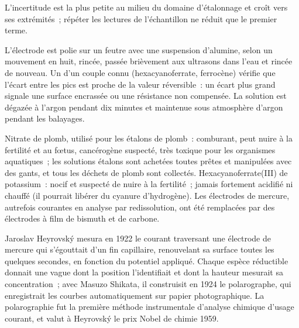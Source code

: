 L'incertitude est la plus petite au milieu du domaine d'étalonnage et
croît vers ses extrémités~; répéter les lectures de l'échantillon ne
réduit que le premier terme.

\begin{inthelab}
L'électrode est polie sur un feutre avec une suspension d'alumine, selon
un mouvement en huit, rincée, passée brièvement aux ultrasons dans l'eau
et rincée de nouveau. Un  d'un couple connu
(hexacyanoferrate, ferrocène) vérifie que l'écart entre les pics est
proche de la valeur réversible~: un écart plus grand signale une surface
encrassée ou une résistance non compensée. La solution est dégazée à
l'argon pendant dix minutes et maintenue sous atmosphère d'argon pendant
les balayages.
\end{inthelab}

\begin{safety}{}
Nitrate de plomb, utilisé pour les étalons de plomb~: comburant, peut
nuire à la fertilité et au fœtus, cancérogène suspecté, très toxique
pour les organismes aquatiques~; les solutions étalons sont achetées
toutes prêtes et manipulées avec des gants, et tous les déchets de plomb
sont collectés. Hexacyanoferrate(III) de potassium~: nocif et suspecté
de nuire à la fertilité~; jamais fortement acidifié ni chauffé (il
pourrait libérer du cyanure d'hydrogène). Les électrodes de mercure,
autrefois courantes en analyse par redissolution, ont été remplacées par
des électrodes à film de bismuth et de carbone.
\end{safety}

\begin{history}
Jaroslav Heyrovský mesura en 1922 le courant traversant une électrode de
mercure qui s'égouttait d'un fin capillaire, renouvelant sa surface
toutes les quelques secondes, en fonction du potentiel appliqué. Chaque
espèce réductible donnait une vague dont la position l'identifiait et
dont la hauteur mesurait sa concentration~; avec Masuzo Shikata, il
construisit en 1924 le polarographe, qui enregistrait les courbes
automatiquement sur papier photographique. La polarographie fut la
première méthode instrumentale d'analyse chimique d'usage courant, et
valut à Heyrovský le prix Nobel de chimie 1959.
\end{history}

